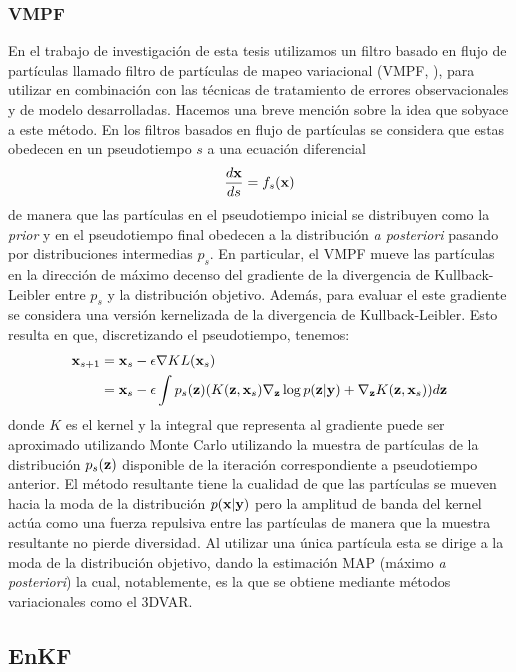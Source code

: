 \subsubsection{VMPF}

En el trabajo de investigación de esta tesis utilizamos un filtro basado en flujo de partículas llamado filtro de partículas de mapeo variacional (VMPF, \cite{Pulido2019}), para utilizar en combinación con las técnicas de tratamiento de errores observacionales y de modelo desarrolladas. Hacemos una breve mención sobre la idea que sobyace a este método. En los filtros basados en flujo de partículas se considera que estas obedecen en un pseudotiempo $s$ a una ecuación diferencial
\begin{align*}
    \frac{d\mathbf{x}}{ds} = f_s(\mathbf{x})
\end{align*}
de manera que las partículas en el pseudotiempo inicial se distribuyen como la \textit{prior} y en el pseudotiempo final obedecen a la distribución \textit{a posteriori} pasando por distribuciones intermedias $p_s$. En particular, el VMPF mueve las partículas en la dirección de máximo decenso del gradiente de la divergencia de Kullback-Leibler entre $p_s$ y la distribución objetivo. Además, para evaluar el este gradiente se considera una versión kernelizada de la divergencia de Kullback-Leibler. Esto resulta en que, discretizando el pseudotiempo, tenemos:
\begin{align*}
    \mathbf{x}_{s+1} &= \mathbf{x}_s - \epsilon \nabla KL(\mathbf{x}_s) \\
    &= \mathbf{x}_s - \epsilon \int p_s(\mathbf{z}) (K(\mathbf{z}, \mathbf{x}_s) \nabla_{\mathbf{z}} \log p(\mathbf{z} | \mathbf{y}) + \nabla_{\mathbf{z}} K(\mathbf{z}, \mathbf{x}_s)) d\mathbf{z}
\end{align*}
donde $K$ es el kernel y la integral que representa al gradiente puede ser aproximado utilizando Monte Carlo utilizando la muestra de partículas de la distribución $p_s(\mathbf{z})$ disponible de la iteración correspondiente a pseudotiempo anterior. El método resultante tiene la cualidad de que las partículas se mueven hacia la moda de la distribución $p(\mathbf{x} | \mathbf{y})$ pero la amplitud de banda del kernel actúa como una fuerza repulsiva entre las partículas \citep{Liu2016} de manera que la muestra resultante no pierde diversidad. Al utilizar una única partícula esta se dirige a la moda de la distribución objetivo, dando la estimación MAP (máximo \textit{a posteriori}) la cual, notablemente, es la que se obtiene mediante métodos variacionales como el 3DVAR.

\subsection{EnKF} \label{sec:enkf}

